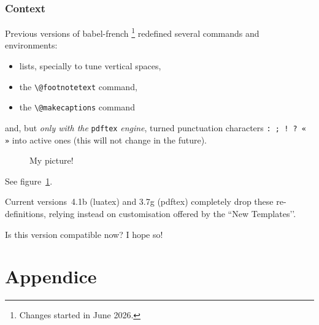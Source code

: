\documentclass[british,french]{article}
\begin{document}
\begin{en}
\section{Context}

Previous versions of babel-french%
\footnote{Changes started in June 2026.}
redefined several commands and environments:
\begin{itemize}
\item lists, specially to tune vertical spaces,
\item the \verb+\@footnotetext+ command,
\item the \verb+\@makecaptions+ command
\end{itemize}
and, but \emph{only with the} \texttt{pdftex} \emph{engine}, turned
punctuation characters \texttt{: ; ! ? « »} into active ones (this will not
change in the future).

\begin{figure}[hb]
  \begin{center}
    \caption{My picture!}
    \label{fig:yy}
  \end{center}
\end{figure}

See figure~\ref{fig:yy}.

Current versions~4.1b (luatex) and 3.7g (pdftex) completely drop these
re-definitions, relying instead on customisation offered by the
``New Templates’’.

Is this version compatible now? I hope so!
\end{en}

\clearpage
{}
\part*{Appendice}
\end{document}
